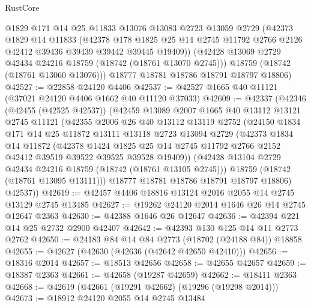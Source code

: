\begin{lexlean}{RustCore}
\begin{coremodule}
        @1829
        @171
        @14
        @25
        @11833
        @13076
        @13083
        @2723
        @13059
        @2729
        (@42373
          @1829
          @14
          @11833
          (@42378
            @178
            @1825
            @25
            @14
            @2745
            @11792
            @2766
            @2126
            @42412
            @39436
            @39439
            @39442
            @39445
            @19409))
        (@42428 @13069 @2729 @42434 @24216 @18759 (@18742 (@18761 @13070 @2745)))
        @18759
        (@18742 (@18761 @13060 @13076)))
      @18777
      @18781
      @18786
      @18791
      @18797
      @18806)
@42527 := @22858 @24120 @4406
@42537 := @42527 @1665 @40 @11121 (@37021 @24120 @4406 @1662 @40 @11120 @37033)
@42609 := @42337
    (@42346
      (@42455 (@42525 @42537))
      (@42459
        @13089
        @2007
        @1665
        @40
        @13112
        @13121
        @2745
        @11121
        (@42355
          @2006
          @26
          @40
          @13112
          @13119
          @2752
          (@24150
            @1834
            @171
            @14
            @25
            @11872
            @13111
            @13118
            @2723
            @13094
            @2729
            (@42373
              @1834
              @14
              @11872
              (@42378
                @1424
                @1825
                @25
                @14
                @2745
                @11792
                @2766
                @2152
                @42412
                @39519
                @39522
                @39525
                @39528
                @19409))
            (@42428 @13104 @2729 @42434 @24216 @18759 (@18742 (@18761 @13105 @2745)))
            @18759
            (@18742 (@18761 @13095 @13111)))
          @18777
          @18781
          @18786
          @18791
          @18797
          @18806)
        @42537))
@42619 := @42457 @4406 @18816 @13124 @2016 @2055 @14 @2745 @13129 @2745 @13485
@42627 := @19262 @24120 @2014 @1646 @26 @14 @2745 @12647 @2363
@42630 := @42388 @1646 @26 @12647
@42636 := @42394 @221 @14 @25 @2732 @2900 @42407
@42642 := @42393 @130 @125 @14 @11 @2773 @2762
@42650 := @24183 @84 @14 @84 @2773 (@18702 (@24188 @84)) @18858
@42655 := @42627 (@42630 (@42636 (@42642 @42650 @42410)))
@42656 := @18316 @2014
@42657 := @18513 @42656
@42658 := @42655 @42657
@42659 := @18387 @2363
@42661 := @42658 (@19287 @42659)
@42662 := @18411 @2363
@42668 := @42619 (@42661 (@19291 @42662) (@19296 (@19298 @2014)))
@42673 := @18912 @24120 @2055 @14 @2745 @13484

\end{coremodule}
\end{lexlean}
